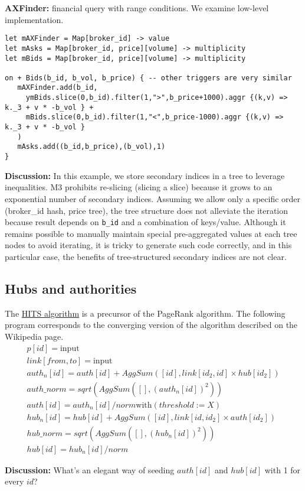 \documentclass[11pt]{article}
\newlength{\dlen}
\def\discuss#1{\par\hspace{2em}
\setlength{\dlen}{\textwidth}
\addtolength{\dlen}{-2em}
\begin{minipage}{\dlen}\footnotesize {\bf\color{red} Discussion:} #1\end{minipage}\par}
\begin{document}
\textbf{AXFinder:} financial query with range conditions. We examine low-level implementation.
\begin{verbatim}
let mAXFinder = Map[broker_id] -> value
let mAsks = Map[broker_id, price][volume] -> multiplicity
let mBids = Map[broker_id, price][volume] -> multiplicity

on + Bids(b_id, b_vol, b_price) { -- other triggers are very similar
   mAXFinder.add(b_id, 
     ymBids.slice(0,b_id).filter(1,">",b_price+1000).aggr {(k,v) =>  k._3 + v * -b_vol } +
     mBids.slice(0,b_id).filter(1,"<",b_price-1000).aggr {(k,v) =>  k._3 + v * -b_vol }
   )
   mAsks.add((b_id,b_price),(b_vol),1)
}
\end{verbatim}
\discuss{In this example, we store secondary indices in a tree to leverage inequalities. M3 prohibits re-slicing (slicing a slice) because it grows to an exponential number of secondary indices. Assuming we allow only a specific order (broker\_id hash, price tree), the tree structure does not alleviate the iteration because result depends on {\tt b\_id} and a combination of keys/value. Although it remains possible to manually maintain special pre-aggregated values at each tree nodes to avoid iterating, it is tricky to generate such code correctly, and in this particular case, the benefits of tree-structured secondary indices are not clear.}


\subsection{Hubs and authorities}
The \href{http://en.wikipedia.org/wiki/HITS_algorithm}{HITS algorithm} is a precursor of the PageRank algorithm.
The following program corresponds to the converging version of the algorithm described on the Wikipedia page.
\[
\begin{array}{l}
p[id] = \text{input} \\
link[from,to] = \text{input} \\
auth_n[id] = auth[id] + AggSum([id], link[id_2,id] \times hub[id_2]) \\
auth\_norm = sqrt(AggSum([], (auth_n[id])^2)) \\
auth[id] = auth_n[id] / norm \text{with} (threshold := X)\\ 
hub_n[id] = hub[id] + AggSum([id], link[id,id_2] \times auth[id_2]) \\
hub\_norm = sqrt(AggSum([], (hub_n[id])^2)) \\
hub[id] = hub_n[id] / norm
\end{array}
\]
\discuss{What's an elegant way of seeding $auth[id]$ and $hub[id]$ with 1 for every $id$?} 
\end{document}
